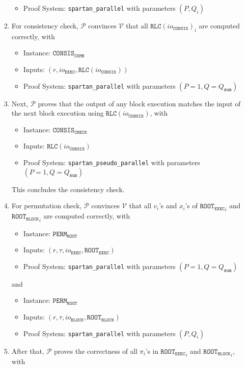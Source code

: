 \documentclass{article}
\newcommand{\code}{\texttt}
\newcommand{\Qsum}{Q_{\mathtt{sum}}}
\renewcommand{\P}{\mathcal{P}}
\newcommand{\V}{\mathcal{V}}
\newcommand{\RLC}{\mathtt{RLC}}
\newcommand{\ioc}{io_{\mathtt{CONSIS}}}
\newcommand{\iob}{io_{\mathtt{BLOCK}}}
\newcommand{\ioe}{io_{\mathtt{EXEC}}}
\newcommand{\ROOTE}{\mathtt{ROOT_{EXEC}}}
\newcommand{\ROOTB}{\mathtt{ROOT_{BLOCK}}}
\begin{document}
\begin{enumerate}
\begin{itemize}
        \item Proof System: \code{spartan\_parallel} with parameters $(P, Q_i)$
    \end{itemize}
    \item For consistency check, $\P$ convinces $\V$ that all $\RLC(\ioc)_i$ are computed correctly, with
    \begin{itemize}
        \item Instance: $\mathtt{CONSIS}_\mathtt{COMB}$
        \item Inputs: $(r, \ioe, \RLC(\ioc))$
        \item Proof System: \code{spartan\_parallel} with parameters $(P = 1, Q = \Qsum)$
    \end{itemize}
    \item Next, $\P$ proves that the output of any block execution matches the input of the next block execution using $\RLC(\ioc)$, with
    \begin{itemize}
        \item Instance: $\mathtt{CONSIS}_\mathtt{CHECK}$
        \item Inputs: $\RLC(\ioc)$
        \item Proof System: \code{spartan\_pseudo\_parallel} with parameters $(P = 1, Q = \Qsum)$
    \end{itemize}
    This concludes the consistency check.
    \item For permutation check, $\P$ convinces $\V$ that all $v_i$'s and $x_i$'s of ${\ROOTE}_i$ and ${\ROOTB}_i$ are computed correctly, with
    \begin{itemize}
        \item Instance: $\mathtt{PERM}_\mathtt{ROOT}$
        \item Inputs: $(r, \tau, \ioe, \ROOTE)$
        \item Proof System: \code{spartan\_parallel} with parameters $(P = 1, Q = \Qsum)$
    \end{itemize}
    and
    \begin{itemize}
        \item Instance: $\mathtt{PERM}_\mathtt{ROOT}$
        \item Inputs: $(r, \tau, \iob, \ROOTB)$
        \item Proof System: \code{spartan\_parallel} with parameters $(P, Q_i)$
    \end{itemize}
    \item After that, $\P$ proves the correctness of all $\pi_i$'s in ${\ROOTE}_i$ and ${\ROOTB}_i$, with
    \begin{itemize}

\end{itemize}
\end{enumerate}
\end{document}
